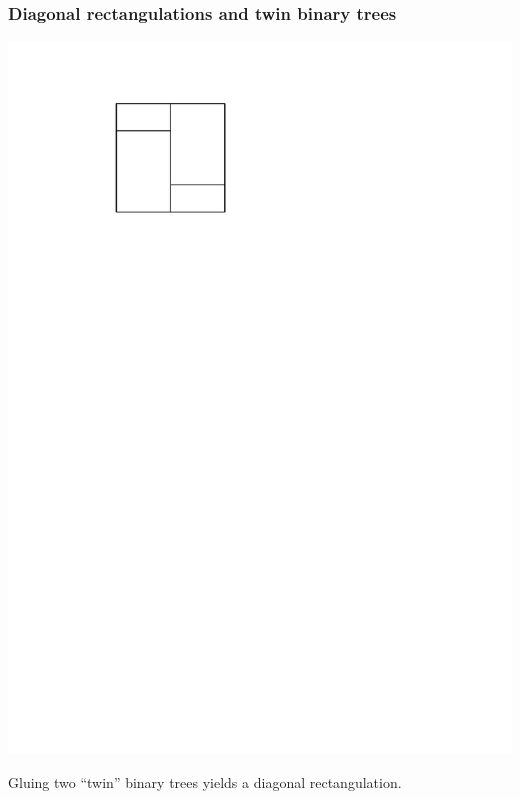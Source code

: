 \documentclass[11pt]{beamer}%
\newcommand{\red}{\color{darkred}}
\renewcommand{\em }{\red}
\begin{document}

\begin{frame}
  \frametitle{Diagonal rectangulations and twin binary trees}
  \begin{center}
    \includegraphics[page=3, width=.8\textwidth]{figures.pdf}
  \end{center}
  Gluing two ``twin'' binary trees yields a {\em diagonal rectangulation}.
\end{frame}
\end{document}
